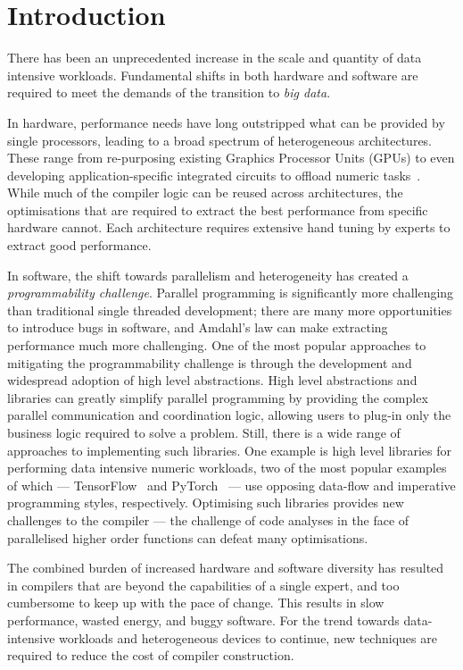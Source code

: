 \chapter{Introduction}

There has been an unprecedented increase in the scale and quantity of data intensive workloads. Fundamental shifts in both hardware and software are required to meet the demands of the transition to \emph{big data}.

In hardware, performance needs have long outstripped what can be provided by single processors, leading to a broad spectrum of heterogeneous architectures. These range from re-purposing existing Graphics Processor Units (GPUs) to even developing application-specific integrated circuits to offload numeric tasks~\cite{Misra2010,Jouppi2017}. While much of the compiler logic can be reused across architectures, the optimisations that are required to extract the best performance from specific hardware cannot. Each architecture requires extensive hand tuning by experts to extract good performance.

In software, the shift towards parallelism and heterogeneity has created a \emph{programmability challenge}. Parallel programming is significantly more challenging than traditional single threaded development; there are many more opportunities to introduce bugs in software, and Amdahl's law can make extracting performance much more challenging. One of the most popular approaches to mitigating the programmability challenge is through the development and widespread adoption of high level abstractions. High level abstractions and libraries can greatly simplify parallel programming by providing the complex parallel communication and coordination logic, allowing users to plug-in only the business logic required to solve a problem. Still, there is a wide range of approaches to implementing such libraries. One example is high level libraries for performing data intensive numeric workloads, two of the most popular examples of which --- TensorFlow~\cite{Abadi} and PyTorch~\cite{Paszke2017} --- use opposing data-flow and imperative programming styles, respectively. Optimising such libraries provides new challenges to the compiler --- the challenge of code analyses in the face of parallelised higher order functions can defeat many optimisations.

The combined burden of increased hardware and software diversity has resulted in compilers that are beyond the capabilities of a single expert, and too cumbersome to keep up with the pace of change. This results in slow performance, wasted energy, and buggy software. For the trend towards data-intensive workloads and heterogeneous devices to continue, new techniques are required to reduce the cost of compiler construction.


